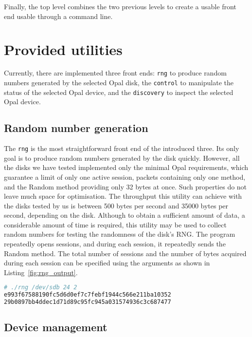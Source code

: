 Finally, the top level combines the two previous levels to create a usable front end usable through a command line.

\section{Provided utilities}

Currently, there are implemented three front ends: \verb|rng| to produce random numbers generated by the selected Opal disk, the \verb|control| to manipulate the status of the selected Opal device, and the \verb|discovery| to inspect the selected Opal device.

\subsection{Random number generation}


The \verb|rng| is the most straightforward front end of the introduced three. Its only goal is to produce random numbers generated by the disk quickly. However, all the disks we have tested implemented only the minimal Opal requirements, which guarantee a limit of only one active session, packets containing only one method, and the Random method providing only 32 bytes at once. Such properties do not leave much space for optimisation. The throughput this utility can achieve with the disks tested by us is between 500 bytes per second and 35000 bytes per second, depending on the disk. Although to obtain a sufficient amount of data, a considerable amount of time is required, this utility may be used to collect random numbers for testing the randomness of the disk's RNG.
The program repeatedly opens sessions, and during each session, it repeatedly sends the Random method. The total number of sessions and the number of bytes acquired during each session can be specified using the arguments as shown in Listing~\ref{fig:rng_output}.

\begin{lstlisting}[language=Bash,caption={Usage and output of the \texttt{rng} utility},label={fig:rng_output}]
# ./rng /dev/sdb 24 2
e993f67588190fc5d6d0ef7c7febf1944c566e211ba10352
29b0897bb4ddec1d71d89c95fc945a031574936c3c687477
\end{lstlisting}

\subsection{Device management}

